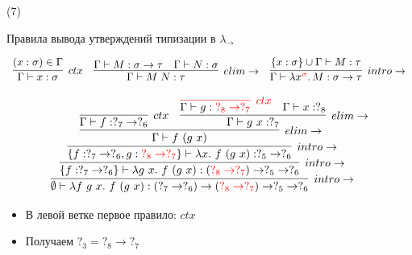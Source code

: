     \begin{frame}[t, noframenumbering]{\btypename (7)}
        \begin{block}{Правила вывода утверждений типизации в $\lambda_{\rightarrow}$}
            \vspace{-1em}
            \begin{center}
                \[
                    \begin{array}{l c r}
                        \infer[ctx]{\Gamma \vdash x: \sigma}{(x: \sigma) \in \Gamma}
                        &
                        \infer[elim\to]{\Gamma \vdash M\;N : \tau}{\Gamma \vdash M : \sigma \to \tau & \Gamma \vdash N : \sigma}
                        &
                        \infer[intro\to]{\Gamma \vdash \lambda x^{\color{red} \sigma}\ldotp M : \sigma \to \tau}{\{x : \sigma\} \cup \Gamma \vdash M : \tau}
                    \end{array}
                \]
            \end{center}
        \end{block}
        \[
            \infer[intro\to]{\emptyset \vdash \lambda f~g~x.~f~(g~x) : (?_7 \to ?_6) \to ({\color{red} ?_8 \to ?_7}) \to ?_5 \to ?_6}{
                \infer[intro\to]{\{f: ?_7 \to ?_6\} \vdash \lambda g~x.~f~(g~x) : ({\color{red} ?_8 \to ?_7}) \to ?_5 \to ?_6}{
                    \infer[intro\to]{\{f: ?_7 \to ?_6, g: {\color{red} ?_8 \to ?_7}\} \vdash \lambda x.~f~(g~x) : ?_5 \to ?_6 }{
                        \infer[elim\to]{\Gamma \vdash f~(g~x) }{
                            \infer[ctx]{\Gamma \vdash f : ?_7 \to ?_6}{} &
                            \infer[elim\to]{\Gamma \vdash g \ap x : ?_7}{
                                \color{red}\infer[ctx]{\color{black}\Gamma \vdash g : {\color{red} ?_8 \to ?_7}}{} &
                                \Gamma \vdash x : ?_8
                            }}}}}
        \]
        \vspace{-1em}
        \begin{itemize}
            \item В левой ветке первое правило: $ctx$
            \item Получаем $?_3 = ?_8 \to ?_7$
        \end{itemize}
    \end{frame}

